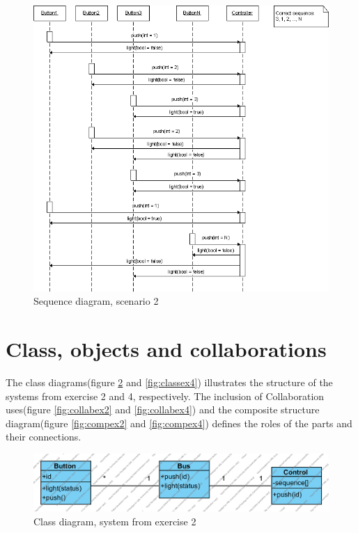 \documentclass{article}
\begin{document}
  \begin{figure}[htbp]
    \centering
  \includegraphics[width=\linewidth]{../sequence_scenario2}
    \caption{Sequence diagram, scenario 2}
    \label{fig:seq2}
  \end{figure}

\section{Class, objects and collaborations}
The class diagrams(figure \ref{fig:class1} and \ref{fig:classex4}) illustrates the 
structure of the systems from exercise 2 and 4, respectively.
The inclusion of Collaboration uses(figure \ref{fig:collabex2} 
and \ref{fig:collabex4}) and the composite 
structure diagram(figure \ref{fig:compex2} and \ref{fig:compex4}) 
defines the roles of the parts and their connections.
\begin{figure}[htbp]
  \centering
\includegraphics[width=\linewidth]{../class1}
  \caption{Class diagram, system from exercise 2}
  \label{fig:class1}
\end{figure}
\end{document}
